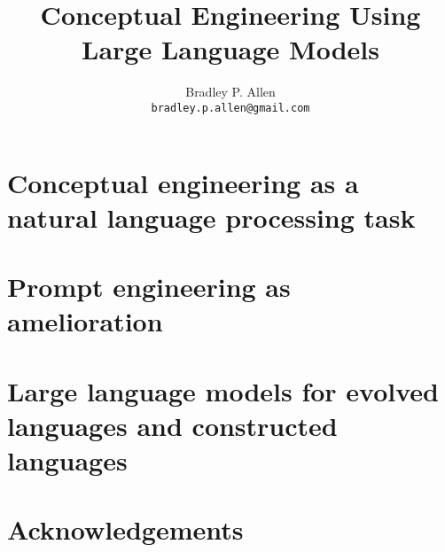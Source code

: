 \documentclass{article}
\title{Conceptual Engineering Using Large Language Models}
\author{Bradley P. Allen\\
\texttt{bradley.p.allen@gmail.com} \\
}
\begin{document}
\maketitle

\begin{abstract}
\end{abstract}


\section{Conceptual engineering as a natural language processing task}

\section{Prompt engineering as amelioration}

\section{Large language models for evolved languages and constructed languages}

\section{Acknowledgements}

\nocite{*}



\end{document}
